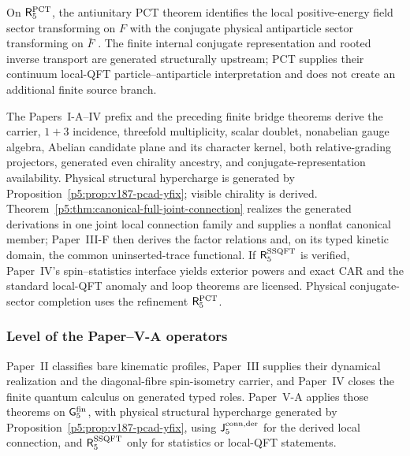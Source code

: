 \documentclass[12pt,a4paper]{article}
\begin{document}
\begin{corollary}
\label{p5:cor:pct-conjugate-completion}
On \(\mathsf R_5^{\rm PCT}\), the antiunitary PCT theorem identifies the local
positive-energy field sector transforming on \(F\) with the conjugate physical
antiparticle sector transforming on \(\bar F\) \cite{Haag1996}.  The finite
internal conjugate representation and rooted inverse transport are generated
structurally upstream; PCT supplies their continuum local-QFT
particle--antiparticle interpretation and does not create an additional finite
source branch.
\end{corollary}

\begin{theorem}
\label{p5:thm:two-residual-sm-constitution}
The Papers~I-A--IV prefix and the preceding finite bridge theorems derive the
carrier, \(1+3\) incidence, threefold multiplicity, scalar doublet,
nonabelian gauge algebra, Abelian candidate plane and its character kernel,
both relative-grading projectors, generated even chirality ancestry, and
conjugate-representation availability.  Physical structural hypercharge is generated by
Proposition~\ref{p5:prop:v187-pcad-yfix}; visible chirality is derived.
Theorem~\ref{p5:thm:canonical-full-joint-connection} realizes the generated
derivations in one joint local connection family and supplies a nonflat
canonical member; Paper~III-F then derives the factor relations and, on its
typed kinetic domain, the common
uninserted-trace functional.  If \(\mathsf R_5^{\rm SSQFT}\) is verified,
Paper~IV's spin--statistics interface yields exterior powers and exact CAR and
the standard local-QFT anomaly and loop theorems are licensed.  Physical
conjugate-sector completion uses the refinement \(\mathsf R_5^{\rm PCT}\).
\end{theorem}


\subsubsection{Level of the Paper--V-A operators}
\label{p5:sec:operator-level}
Paper~II classifies bare kinematic profiles, Paper~III supplies their
dynamical realization and the diagonal-fibre spin-isometry carrier, and
Paper~IV closes the finite quantum calculus on generated typed roles.
Paper~V-A applies those theorems on \(\mathsf G_5^{\rm fin}\), with physical
structural hypercharge generated by Proposition~\ref{p5:prop:v187-pcad-yfix},
using \(\mathsf J_5^{\rm conn,der}\) for the derived local connection, and
\(\mathsf R_5^{\rm SSQFT}\) only for statistics or local-QFT statements.
\end{document}
